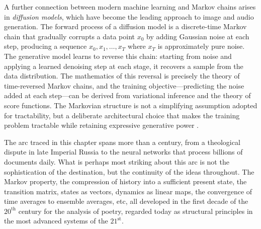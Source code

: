 A further connection between modern machine learning and Markov chains arises in \textit{diffusion models}, which have become the leading approach to image and audio generation. The forward process of a diffusion model is a discrete-time Markov chain that gradually corrupts a data point $x_0$ by adding Gaussian noise at each step, producing a sequence $x_0, x_1, \dots, x_T$ where $x_T$ is approximately pure noise. The generative model learns to reverse this chain: starting from noise and applying a learned denoising step at each stage, it recovers a sample from the data distribution. The mathematics of this reversal is precisely the theory of time-reversed Markov chains, and the training objective---predicting the noise added at each step---can be derived from variational inference and the theory of score functions. The Markovian structure is not a simplifying assumption adopted for tractability, but a deliberate architectural choice that makes the training problem tractable while retaining expressive generative power \cite{ho_2020_denoising}.

\newpage

The arc traced in this chapter spans more than a century, from a theological dispute in late Imperial Russia to the neural networks that process billions of documents daily. What is perhaps most striking about this arc is not the sophistication of the destination, but the continuity of the ideas throughout. The Markov property, the compression of history into a sufficient present state, the transition matrix, states as vectors, dynamics as linear maps, the convergence of time averages to ensemble averages, etc, all developed in the first decade of the $20^{\text{th}}$ century for the analysis of poetry, regarded today as structural principles in the most advanced systems of the $21^{\text{st}}$. 
